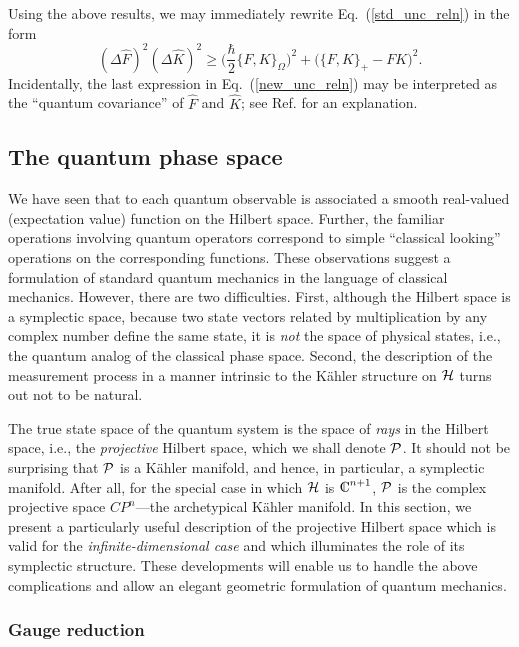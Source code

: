 \documentclass[12pt,aps,eqsecnum,tighten]{revtex4-2}
\def\be{\begin{equation}}
\def\ee{\end{equation}}
\def\D{\Delta}
\def\C{{\mathbb C}}
\def\H{{\cal H}}
\def\P{{\cal P}}
\def\W{\Omega}
\newcommand{\eqn}[1]{Eq.~(\ref{#1})}
\def\Bbb{}
\def\Comp{{\mathchoice
{\setbox0=\hbox{$\displaystyle\rm C$}\hbox{\hbox to0pt
{\kern0.4\wd0\vrule height0.9\ht0\hss}\box0}}
{\setbox0=\hbox{$\textstyle\rm C$}\hbox{\hbox to0pt
{\kern0.4\wd0\vrule height0.9\ht0\hss}\box0}}
{\setbox0=\hbox{$\scriptstyle\rm C$}\hbox{\hbox to0pt
{\kern0.4\wd0\vrule height0.9\ht0\hss}\box0}}
{\setbox0=\hbox{$\scriptscriptstyle\rm C$}\hbox{\hbox to0pt
{\kern0.4\wd0\vrule height0.9\ht0\hss}\box0}}}}
\def\C{\Comp}
\begin{document}
Using the above results, we may immediately rewrite \eqn{std_unc_reln}
in the form 
%
\be \label{new_unc_reln}
(\D \hat{F})^2 (\D \hat{K})^2 \ge
\bigg( \frac{\hbar}{2} \{ F, K \}_\W \bigg)^2
+ \big( \{ F, K \}_+ - FK \big)^2.
\ee
%
Incidentally, the last expression in \eqn{new_unc_reln} may be
interpreted as the ``quantum covariance'' of $\hat{F}$ and $\hat{K}$;
see Ref.  for an explanation.


\subsection{The quantum phase space} \label{sec2.B}

We have seen that to each quantum observable is associated a smooth
real-valued (expectation value) function on the Hilbert space.
Further, the familiar operations involving quantum operators
correspond to simple ``classical looking'' operations on the
corresponding functions.  These observations suggest a formulation of
standard quantum mechanics in the language of classical mechanics.
However, there are two difficulties.  First, although the Hilbert
space is a symplectic space, because two state vectors related by
multiplication by any complex number define the same state, it is {\it
not} the space of physical states, i.e., the quantum analog of the
classical phase space.  Second, the description of the measurement
process in a manner intrinsic to the K\"ahler structure on $\H$ turns
out not to be natural.

The true state space of the quantum system is the space of {\em rays}
in the Hilbert space, i.e., the {\em projective} Hilbert space, which
we shall denote $\P$.  It should not be surprising that $\P$ is a
K\"ahler manifold, and hence, in particular, a symplectic manifold.
After all, for the special case in which $\H$ is $\C^{n+1}$, $\P$ is
the complex projective space ${\Bbb CP}^n$---the archetypical K\"ahler
manifold.  In this section, we present a particularly useful
description of the projective Hilbert space which is valid for the
{\it infinite-dimensional case} and which illuminates the role of its
symplectic structure.  These developments will enable us to handle the
above complications and allow an elegant geometric formulation of
quantum mechanics.


\subsubsection{Gauge reduction}
\end{document}
